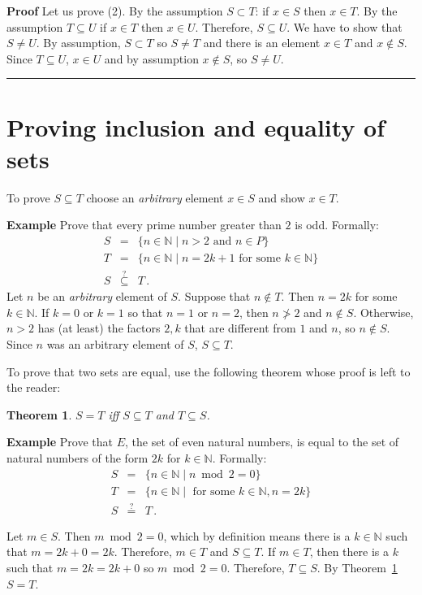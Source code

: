 \documentclass[12pt,a4paper]{article}
\newtheorem{theorem}{Theorem}
\newcommand*{\qed}{\hfill\rule[-2pt]{4pt}{10pt}}
\newcommand*{\ind}{\hspace*{2em}}
\newenvironment{example}{\textbf{Example}}{}
\newenvironment{proof}{\textbf{Proof}}{\qed}
\begin{document}
\begin{proof}
Let us prove (2). By the assumption $S\subset T$: if $x\in S$ then $x\in T$. By the assumption $T\subseteq U$ if $x\in T$ then $x\in U$. Therefore, $S\subseteq U$. We have to show that $S\neq U$. By assumption, $S \subset T$ so $S\neq T$ and there is an element $x\in T$ and $x\not \in S$. Since $T\subseteq U$, $x\in U$ and by assumption $x\not \in S$, so $S\neq U$.
\end{proof}

\section{Proving inclusion and equality of sets}

To prove $S\subseteq T$ choose an \emph{arbitrary} element $x\in S$
and show $x\in T$.

\begin{example}
Prove that every prime number greater than $2$ is odd. Formally:
\begin{eqnarray*}
S&=&\{n \in \mathbb{N} \mid n>2 \textrm{\ and \ } n\in P\}\\ 
T&=& \{n\in \mathbb{N} \mid n=2k+1 \textrm{\ for some \ } k\in \mathbb{N}\}\\
S&\stackrel{?}{\subseteq}& T\,.
\end{eqnarray*}
Let $n$ be an \emph{arbitrary} element of $S$. Suppose that $n\not\in T$. Then $n=2k$ for some $k\in \mathbb{N}$. If $k=0$ or $k=1$ so that $n=1$ or $n=2$, then $n\not>2$ and $n\not\in S$. Otherwise, $n>2$ has (at least) the factors $2,k$ that are different from $1$ and $n$, so $n\not \in S$. Since $n$ was an arbitrary element of $S$, $S\subseteq T$.
\end{example}

To prove that two sets are equal, use the following theorem whose proof is left to the reader:
\begin{theorem}\label{thm.setsequal}
\ind $S=T$ iff $S\subseteq T$ and $T\subseteq S$.
\end{theorem}

\begin{example}
Prove that $E$, the set of even natural numbers, is equal to the set of natural numbers of the form $2k$ for $k\in\mathbb{N}$. Formally:
\begin{eqnarray*}
S&=&\{n\in \mathbb{N} \mid  n \bmod 2 = 0\}\\
T&=&\{n\in \mathbb{N} \mid \textrm{\ for some\ } k\in \mathbb{N}, n=2k\}\\
S&\stackrel{?}{=}&T\,.
\end{eqnarray*}

Let $m\in S$. Then $m\bmod 2 = 0$, which by definition means there is a $k\in \mathbb{N}$ such that $m=2k+0=2k$. Therefore, $m\in T$ and $S\subseteq T$. If $m\in T$, then there is a $k$ such that $m=2k=2k+0$ so $m\bmod 2=0$. Therefore, $T\subseteq S$. By Theorem~\ref{thm.setsequal} $S=T$.
\end{example}
\end{document}
